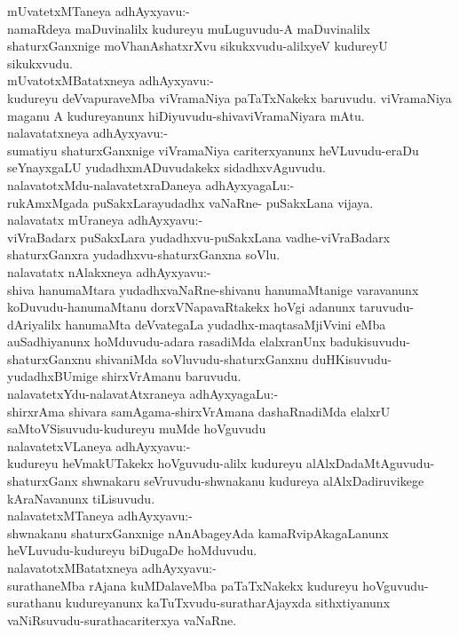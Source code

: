 \documentclass{article}
\begin{document}
mUvatetxMTaneya adhAyxyavu:-\\
namaRdeya maDuvinalilx kudureyu muLuguvudu-A maDuvinalilx shaturxGanxnige moVhanAshatxrXvu sikukxvudu-alilxyeV kudureyU sikukxvudu.\\
mUvatotxMBatatxneya adhAyxyavu:-\\
kudureyu deVvapuraveMba viVramaNiya paTaTxNakekx baruvudu. viVramaNiya maganu A kudureyanunx hiDiyuvudu-shivaviVramaNiyara mAtu.\\
nalavatatxneya adhAyxyavu:-\\
sumatiyu shaturxGanxnige viVramaNiya cariterxyanunx heVLuvudu-eraDu seYnayxgaLU yudadhxmADuvudakekx sidadhxvAguvudu.\\
nalavatotxMdu-nalavatetxraDaneya adhAyxyagaLu:-\\
rukAmxMgada puSakxLarayudadhx vaNaRne- puSakxLana vijaya.\\
nalavatatx mUraneya adhAyxyavu:-\\
viVraBadarx puSakxLara yudadhxvu-puSakxLana vadhe-viVraBadarx shaturxGanxra yudadhxvu-shaturxGanxna soVlu.\\
nalavatatx nAlakxneya adhAyxyavu:-\\
shiva hanumaMtara yudadhxvaNaRne-shivanu hanumaMtanige varavanunx koDuvudu-hanumaMtanu dorxVNapavaRtakekx hoVgi adanunx taruvudu-dAriyalilx hanumaMta deVvategaLa yudadhx-maqtasaMjiVvini eMba auSadhiyanunx hoMduvudu-adara rasadiMda elalxranUnx badukisuvudu-shaturxGanxnu shivaniMda soVluvudu-shaturxGanxnu duHKisuvudu-yudadhxBUmige shirxVrAmanu baruvudu.\\
nalavatetxYdu-nalavatAtxraneya adhAyxyagaLu:-\\
shirxrAma shivara samAgama-shirxVrAmana dashaRnadiMda elalxrU saMtoVSisuvudu-kudureyu muMde hoVguvudu\\
nalavatetxVLaneya adhAyxyavu:-\\
kudureyu heVmakUTakekx hoVguvudu-alilx kudureyu alAlxDadaMtAguvudu-shaturxGanx shwnakaru seVruvudu-shwnakanu kudureya alAlxDadiruvikege kAraNavanunx tiLisuvudu.\\
nalavatetxMTaneya adhAyxyavu:-\\
shwnakanu shaturxGanxnige nAnAbageyAda kamaRvipAkagaLanunx heVLuvudu-kudureyu biDugaDe hoMduvudu.\\
nalavatotxMBatatxneya adhAyxyavu:-\\
surathaneMba rAjana kuMDalaveMba paTaTxNakekx kudureyu hoVguvudu-surathanu kudureyanunx kaTuTxvudu-suratharAjayxda sithxtiyanunx vaNiRsuvudu-surathacariterxya vaNaRne.\\
\end{document}

